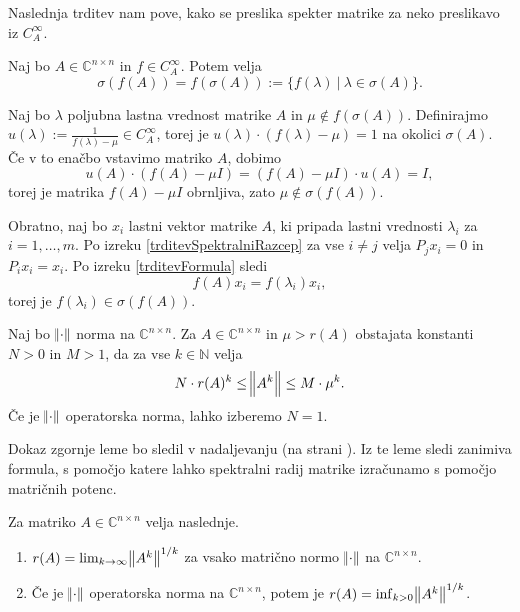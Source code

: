 \documentclass[mat1]{fmfdelo}
\newcommand{\N}{\mathbb N}
\newcommand{\C}{\mathbb C}
\begin{document}
Naslednja trditev nam pove, kako se preslika spekter matrike za neko preslikavo iz $C_A^\infty$.
\begin{izrek} \label{izrekOPreslikaviSpektra}
    Naj bo $A \in \C^{n \times n}$ in $f \in C_A^\infty$. Potem velja
    \begin{equation*}
        \sigma\left(f\left(A\right)\right) = f\left(\sigma\left(A\right)\right) := \{f(\lambda)\ |\ \lambda \in \sigma(A)\}.
    \end{equation*}
\end{izrek}
\begin{dokaz}
    Naj bo $\lambda$ poljubna lastna vrednost matrike $A$ in $\mu \notin f(\sigma(A))$. Definirajmo $u(\lambda) := \frac{1}{f(\lambda) - \mu} \in C_A^\infty$, torej je $u(\lambda) \cdot (f(\lambda) - \mu) = 1$ na okolici $\sigma(A)$. Če v to enačbo vstavimo matriko $A$, dobimo
    \begin{equation*}
        u(A) \cdot (f(A) - \mu I) = (f(A) - \mu I) \cdot u(A) = I,
    \end{equation*}
    torej je matrika $f(A) - \mu I$ obrnljiva, zato $\mu \notin \sigma(f(A))$.
    
    Obratno, naj bo $x_i$ lastni vektor matrike $A$, ki pripada lastni vrednosti $\lambda_i$ za $i = 1, \ldots, m$. Po izreku \ref{trditevSpektralniRazcep} za vse $i \neq j$ velja $P_j x_i = 0$ in $P_i x_i = x_i$. Po izreku \ref{trditevFormula} sledi
    \begin{equation*}
        f(A) x_i = f(\lambda_i) x_i,
    \end{equation*}
    torej je $f(\lambda_i) \in \sigma(f(A))$.
\end{dokaz}

\begin{lema}\label{lemaNorme}
    Naj bo $\norm{\cdot}$ norma na $\C^{n \times n}$. Za $A \in \C^{n \times n}$ in $\mu > r(A)$ obstajata konstanti $N > 0$ in $M > 1$, da za vse $k \in \N$ velja
    \begin{equation*}
        N \cdot r(A)^k \leq \norm{A^k} \leq M \cdot \mu^k.
    \end{equation*}
    Če je $\norm{\cdot}$ operatorska norma, lahko izberemo $N = 1$.
\end{lema}
Dokaz zgornje leme bo sledil v nadaljevanju (na strani \pageref{dokazLemaNorme}). Iz te leme sledi zanimiva formula, s pomočjo katere lahko spektralni radij matrike izračunamo s pomočjo matričnih potenc.
\begin{trditev}  \label{gelfand}
    Za matriko $A \in \C^{n \times n}$ velja naslednje.
    \begin{enumerate}
        \item $r(A) = \lim_{k \rightarrow \infty} \norm{A^k}^{1/k}$ za vsako matrično normo $\norm{\cdot}$ na $\C^{n \times n}$.
        \item Če je $\norm{\cdot}$ operatorska norma na $\C^{n \times n}$, potem je $r(A) = \inf_{k > 0} \norm{A^k}^{1/k}$.
    \end{enumerate}
\end{trditev}
\end{document}

